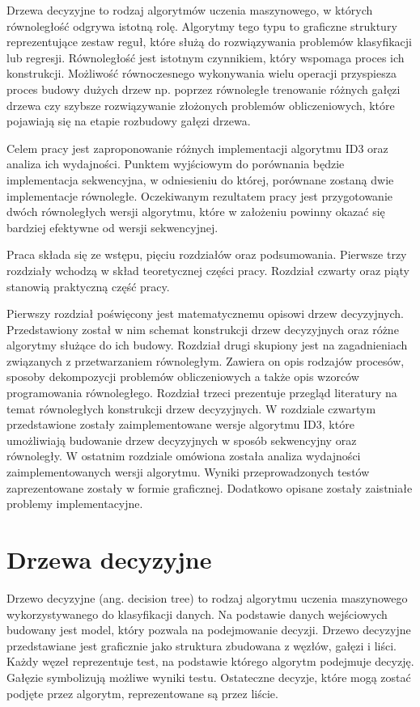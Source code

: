 \documentclass[12pt]{article}
\begin{document}
Drzewa decyzyjne to rodzaj algorytmów uczenia maszynowego, w których równoległość odgrywa istotną rolę.
Algorytmy tego typu to graficzne struktury reprezentujące zestaw reguł, które służą do rozwiązywania problemów klasyfikacji lub regresji.
Równoległość jest istotnym czynnikiem, który wspomaga proces ich konstrukcji. Możliwość równoczesnego wykonywania wielu operacji
przyspiesza proces budowy dużych drzew np. poprzez równoległe trenowanie różnych gałęzi drzewa czy szybsze rozwiązywanie złożonych
problemów obliczeniowych, które pojawiają się na etapie rozbudowy gałęzi drzewa.

Celem pracy jest zaproponowanie różnych implementacji algorytmu ID3 oraz analiza ich wydajności.
Punktem wyjściowym do porównania będzie implementacja sekwencyjna, w odniesieniu do której, porównane zostaną dwie implementacje równoległe.
Oczekiwanym rezultatem pracy jest przygotowanie dwóch równoległych wersji algorytmu, które w założeniu powinny okazać się bardziej
efektywne od wersji sekwencyjnej.

Praca składa się ze wstępu, pięciu rozdziałów oraz podsumowania. Pierwsze trzy
rozdziały wchodzą w skład teoretycznej części pracy. Rozdział czwarty oraz piąty
stanowią praktyczną część pracy.

Pierwszy rozdział poświęcony jest matematycznemu opisowi drzew decyzyjnych.
Przedstawiony został w nim schemat konstrukcji drzew decyzyjnych oraz różne algorytmy służące
do ich budowy. Rozdział drugi skupiony jest na zagadnieniach związanych z przetwarzaniem równoległym.
Zawiera on opis rodzajów procesów, sposoby dekompozycji problemów obliczeniowych a także
opis wzorców programowania równoległego. Rozdział trzeci prezentuje przegląd literatury 
na temat równoległych konstrukcji drzew decyzyjnych. W rozdziale czwartym przedstawione
zostały zaimplementowane wersje algorytmu ID3, które umożliwiają budowanie drzew decyzyjnych w sposób
sekwencyjny oraz równoległy. W ostatnim rozdziale omówiona została analiza wydajności zaimplementowanych
wersji algorytmu. Wyniki przeprowadzonych testów zaprezentowane zostały w formie graficznej.
Dodatkowo opisane zostały zaistniałe problemy implementacyjne. 
\newpage

\section{Drzewa decyzyjne}
Drzewo decyzyjne (ang. decision tree) to rodzaj algorytmu uczenia maszynowego
wykorzystywanego do klasyfikacji danych. Na podstawie danych wejściowych budowany jest model,
który pozwala na podejmowanie decyzji. Drzewo decyzyjne przedstawiane jest graficznie jako
struktura zbudowana z węzłów, gałęzi i liści. Każdy węzeł reprezentuje test, na podstawie
którego algorytm podejmuje decyzję. Gałęzie symbolizują możliwe wyniki testu. Ostateczne
decyzje, które mogą zostać podjęte przez algorytm, reprezentowane są przez liście.
\end{document}
